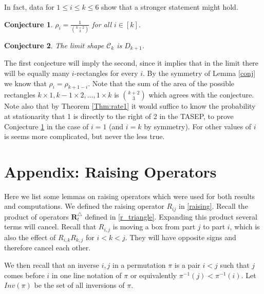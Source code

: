\documentclass[11pt]{amsart}
\newtheorem{conjecture}{Conjecture}[]
\begin{document}
In fact, data for $1\le i\le k\le 6$ show that a stronger statement might hold.
\begin{conjecture}\label{conj:rho}
    $\rho_i=\frac{1}{\binom{k+2}{3}}$ for all $i \in [k].$
\end{conjecture}
\begin{conjecture}\label{conj:limitshape}
    The limit shape $\mathcal C_k$ is $D_{k+1}$.
\end{conjecture}
 The first conjecture will imply the second, since it implies that in the limit there will be equally many $i$-rectangles for every $i$. By the symmetry of 
 Lemma \ref{conj} we know that $\rho_i=\rho_{k+1-i}$.
 Note that the sum of the area of the possible rectangles $k\times 1, k-1\times 2,\dots,1\times k$ is $\binom{k+2}{3}$ which agrees with the conjecture. Note also that by Theorem \ref{Thm:rate1} it would suffice to know the probability at stationarity that 1 is directly to the right of 2 in the TASEP, to prove Conjecture \ref{conj:rho} in the case of $i=1$ (and $i=k$ by symmetry). For other values of $i$ is seems more complicated, but never the less true.


\section{Appendix: Raising Operators} \label{appendix}
Here we list some lemmas on raising operators which were used for both results and computations. We defined the raising operator $R_{ij}$  in \eqref{raising}. Recall the product of operators $\mathbf{R}^\triangle_t$ defined in \eqref{r_triangle}. Expanding this product several terms will cancel. Recall that $R_{i,j}$ is moving a box from part $j$ to part $i$, which is also the effect of $R_{i,k}R_{k,j}$ for $i<k<j$. They will have opposite signs and therefore cancel each other.

We then recall that an inverse $i,j$ in a permutation $\pi$ is a pair $i<j$ such that $j$ comes before $i$ in one line notation of $\pi$ or equivalently $\pi^{-1}(j)<\pi^{-1}(i)$. Let $Inv(\pi)$ be the set of all inversions of $\pi$.
\end{document}
